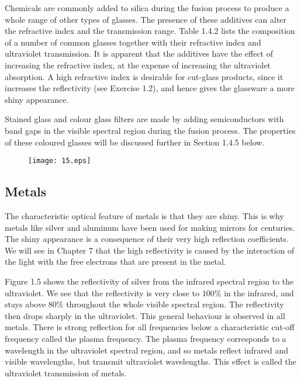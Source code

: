 \documentclass[12pt]{book}
\begin{document}
Chemicals are commonly added to silica during the fusion process to produce a whole range of other types of glasses. The presence of these additives can alter the refractive index and the transmission range. Table 1.4.2 lists the composition of a number of common glasses together with their refractive index and ultraviolet transmission. It is apparent that the additives have the effect of increasing the refractive index, at the expense of increasing the ultraviolet absorption. A high refractive index is desirable for cut-glass products, since it increases the reflectivity (see Exercise 1.2), and hence gives the glassware a more shiny appearance.

Stained glass and colour glass filters are made by adding semiconductors with band gaps in the visible spectral region during the fusion process. The properties of these coloured glasses will be discussed further in Section 1.4.5 below.

\begin{figure}
  \centering
  \texttt{[image: 15.eps]}\label{fig:1.5}\\
\end{figure}

\subsection{Metals}

The characteristic optical feature of metals is that they are shiny. This is why metals like silver and aluminum have been used for making mirrors for centuries. The shiny appearance is a consequence of their very high reflection coefficients. We will see in Chapter 7 that the high reflectivity is caused by the interaction of the light with the free electrons that are present in the metal.

Figure 1.5 shows the reflectivity of silver from the infrared spectral region to the ultraviolet. We see that the reflectivity is very close to $100 \%$ in the infrared, and stays above $80 \%$ throughout the whole visible spectral region. The reflectivity then drops sharply in the ultraviolet. This general behaviour is observed in all metals. There is strong reflection for all frequencies below a characteristic cut-off frequency called the plasma frequency. The plasma frequency corresponds to a wavelength in the ultraviolet spectral region, and so metals reflect infrared and visible wavelengths, but transmit ultraviolet wavelengths. This effect is called the ultraviolet transmission of metals.
\end{document}
